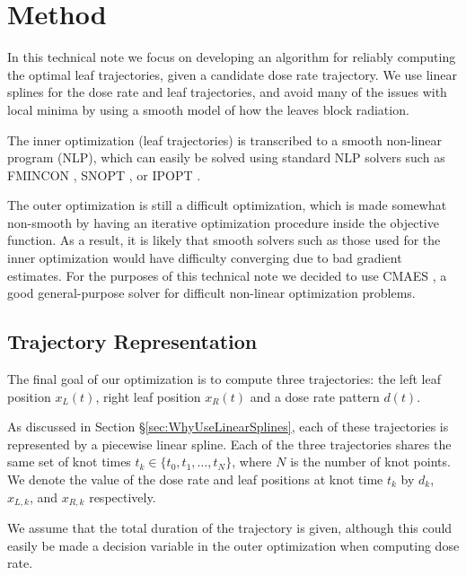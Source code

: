 \section{Method}

In this technical note we focus on developing an algorithm for reliably computing the optimal
leaf trajectories, given a candidate dose rate trajectory.
We use linear splines for the dose rate and leaf trajectories,
and avoid many of the issues with local minima by using a smooth model of how the leaves block radiation.

The inner optimization (leaf trajectories) is transcribed to a smooth non-linear program (NLP),
which can easily be solved using standard NLP solvers such as
FMINCON \cite{MatlabOptimizationToolbox2014}, SNOPT \cite{Snopt7}, or IPOPT \cite{Wachter2006}.

The outer optimization is still a difficult optimization, which is made somewhat non-smooth by
having an iterative optimization procedure inside the objective function.
As a result, it is likely that smooth solvers such as those used for the inner optimization would
have difficulty converging due to bad gradient estimates.
For the purposes of this technical note we decided to use CMAES \cite{Hansen2001},
a good general-purpose solver for difficult non-linear optimization problems.

\subsection{Trajectory Representation}

The final goal of our optimization is to compute three trajectories:
the left leaf position $x_L(t)$, right leaf position $x_R(t)$ and a dose rate pattern $d(t)$.

As discussed in Section \S \ref{sec:WhyUseLinearSplines}, each of these trajectories is
represented by a piecewise linear spline. Each of the three trajectories shares the same set of
knot times $t_k \in \{t_0, t_1, \dots, t_N\}$, where $N$ is the number of knot points.
We denote the value of the dose rate and leaf positions at knot time $t_k$ by $d_k$, $x_{L,k}$, and $x_{R,k}$ respectively.

We assume that the total duration of the trajectory is given, although this could easily be made
a decision variable in the outer optimization when computing dose rate. 

